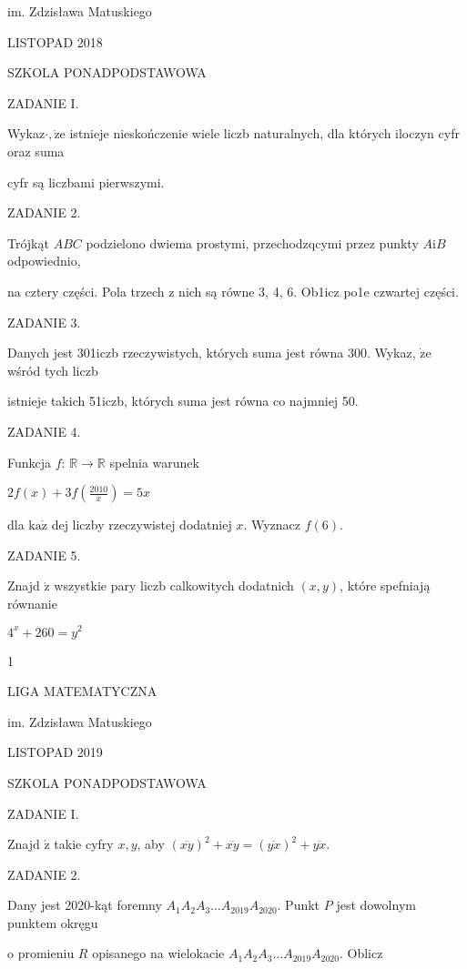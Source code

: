 \documentclass[a4paper,12pt]{article}
\begin{document}
im. Zdzisława Matuskiego

LISTOPAD 2018

SZKOLA PONADPODSTAWOWA

ZADANIE I.

Wykaz$\cdot, \dot{\mathrm{z}}\mathrm{e}$ istnieje nieskończenie wiele liczb naturalnych, dla których iloczyn cyfr oraz suma

cyfr są liczbami pierwszymi.

ZADANIE 2.

Trójkąt $ABC$ podzielono dwiema prostymi, przechodzqcymi przez punkty $A\mathrm{i}B$ odpowiednio,

na cztery części. Pola trzech z nich są równe 3, 4, 6. Ob1icz po1e czwartej części.

ZADANIE 3.

Danych jest 301iczb rzeczywistych, których suma jest równa 300. Wykaz, $\dot{\mathrm{z}}\mathrm{e}$ wśród tych liczb

istnieje takich 51iczb, których suma jest równa co najmniej 50.

ZADANIE 4.

Funkcja $f$: $\mathbb{R}\rightarrow \mathbb{R}$ spelnia warunek

$2f(x)+3f(\displaystyle \frac{2010}{x})=5x$

dla $\mathrm{k}\mathrm{a}\dot{\mathrm{z}}$ dej liczby rzeczywistej dodatniej $x$. Wyznacz $f(6).$

ZADANIE 5.

Znajd $\acute{\mathrm{z}}$ wszystkie pary liczb calkowitych dodatnich $(x,y)$, które spefniają równanie

$4^{x}+260=y^{2}$

1






LIGA MATEMATYCZNA

im. Zdzisława Matuskiego

LISTOPAD 2019

SZKOLA PONADPODSTAWOWA

ZADANIE I.

Znajd $\acute{\mathrm{z}}$ takie cyfry $x, y$, aby $(\overline{xy})^{2}+\overline{xy}=(\overline{yx})^{2}+\overline{yx}.$

ZADANIE 2.

Dany jest 2020-kąt foremny $A_{1}A_{2}A_{3}\ldots A_{2019}A_{2020}$. Punkt $P$ jest dowolnym punktem okręgu

o promieniu $R$ opisanego na wielokacie $A_{1}A_{2}A_{3}\ldots A_{2019}A_{2020}$. Oblicz
\end{document}

